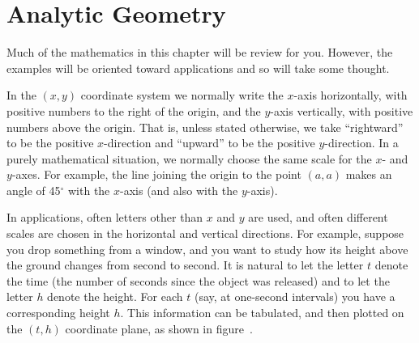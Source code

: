 \chapter{Analytic Geometry}

Much of the mathematics in this chapter will be review for you.  However, the
examples will be oriented toward applications and so 
will take some thought.

In the $(x,y)$ coordinate system we normally write the $x$-axis
horizontally, with positive numbers to the right of the origin, and
the $y$-axis vertically, with positive numbers above the origin.  That
is, unless stated otherwise, we take ``rightward'' to be the positive
$x$-direction and ``upward'' to be the positive $y$-direction.  In a
purely mathematical situation, we normally choose the same scale for
the $x$- and $y$-axes.  For example, the line joining the origin to
the point $(a,a)$ makes an angle of 45${}^\circ$ with the $x$-axis
(and also with the $y$-axis).

In applications, often letters other than $x$ and $y$ are used, and
often different scales are chosen in the horizontal and vertical
directions.  For example, suppose you drop something from a window,
and you want to study how its height above the ground changes from
second to second.  It is natural to let the letter $t$ denote the time
(the number of seconds since the object was released) and to let the
letter $h$ denote the height.  For each $t$ (say, at one-second
intervals) you have a corresponding height $h$.  This information can
be tabulated, and then plotted on the $(t,h)$ coordinate plane, as
shown in figure~.



